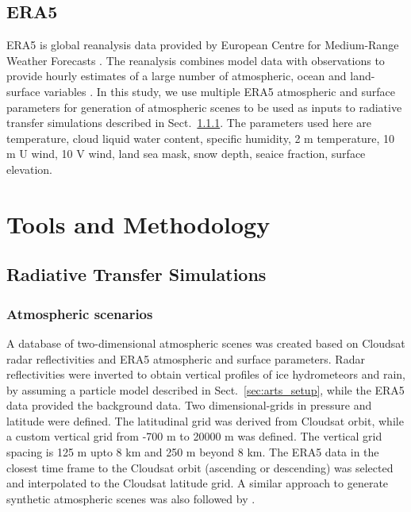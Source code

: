 \documentclass[amt, manuscript]{copernicus}
\begin{document}
\subsection{ERA5}
%
\label{sec:era5}
ERA5 is global reanalysis data provided by European Centre for Medium-Range Weather Forecasts  \citep[ECMWF,][]{era5:18}. The reanalysis combines model data with observations to provide hourly estimates of a large number of atmospheric, ocean and land-surface variables . In this study, we use multiple ERA5 atmospheric and surface parameters for generation of atmospheric scenes to be used as inputs to radiative transfer simulations described in Sect.~\ref{sec:atm_scenes}. The parameters used here are temperature, cloud liquid water content, specific humidity, 2\,\,m temperature, 10\,\,m U wind, 10\,\,V wind, land sea mask, snow depth, seaice fraction, surface elevation. 

\section{Tools and Methodology}

\subsection{Radiative Transfer Simulations}
\label{sec:rt_simulations}

\subsubsection{Atmospheric scenarios}
\label{sec:atm_scenes}

A database of two-dimensional atmospheric scenes was created based on Cloudsat radar reflectivities and ERA5 atmospheric and surface parameters. Radar reflectivities were inverted to obtain vertical profiles of ice hydrometeors and rain, by assuming a particle model described in Sect.~\ref{sec:arts_setup}, while the ERA5 data provided the background data. Two dimensional-grids in pressure and latitude were defined. The latitudinal grid was derived from Cloudsat orbit, while a custom vertical grid from -700\,\,m to 20000\,\,m was defined. The vertical grid spacing is 125\,\,m upto 8\,\,km and 250\,\,m beyond 8\,\,km. The ERA5 data in the closest time frame to the Cloudsat orbit (ascending or descending) was selected and interpolated to the Cloudsat latitude grid. A similar approach to generate synthetic atmospheric scenes was also followed by \citet{ekelund2020using}.  
\end{document}
